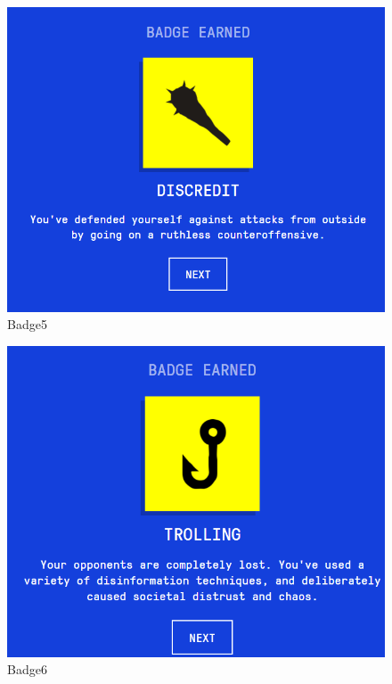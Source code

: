 \documentclass[12pt]{article}
\begin{document}
\clearpage
\begin{figure}[h]
    \centering
    \includegraphics[trim=0 0 0 0, clip, width=\textwidth] {Capture5.PNG}
    \caption{Badge5}
    \label{fig5}
\end{figure}
\clearpage
\begin{figure}[h]
    \centering
    \includegraphics[trim=0 0 0 0, clip, width=\textwidth] {Capture6.PNG}
    \caption{Badge6}
    \label{fig6}
\end{figure}
\end{document}
